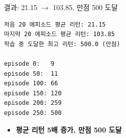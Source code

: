 \begin{frame}[fragile]{결과: 21.15 $\to$ 103.85, 만점 500 도달}
  \small
  \begin{verbatim}
처음 20 에피소드 평균 리턴: 21.15
마지막 20 에피소드 평균 리턴: 103.85
학습 중 도달한 최고 리턴: 500.0 (만점)

episode 0:   9
episode 50:  11
episode 100: 66
episode 150: 120
episode 200: 259
episode 250: 500
  \end{verbatim}
  \begin{itemize}
    \item \textbf{평균 리턴 5배 증가, 만점 500 도달}
    
  \end{itemize}
  \normalsize

\end{frame}
